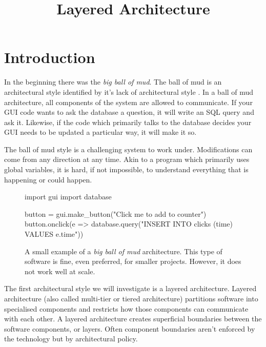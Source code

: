 \title{Layered Architecture}
\maketitle

\section{Introduction}
In the beginning there was the \textsl{big ball of mud}.
The ball of mud is an architectural style identified by it's lack of architectural style \cite{ballofmud}.
In a ball of mud architecture, all components of the system are allowed to communicate.
If your GUI code wants to ask the database a question, it will write an SQL query and ask it.
Likewise, if the code which primarily talks to the database decides your GUI needs to be updated a particular way, it will make it so.

The ball of mud style is a challenging system to work under.
Modifications can come from any direction at any time.
Akin to a program which primarily uses global variables,
it is hard, if not impossible,
to understand everything that is happening or could happen.



\begin{figure}[ht]
\begin{code}[style=python]{}
import gui
import database

button = gui.make_button("Click me to add to counter")
button.onclick(e => 
    database.query("INSERT INTO clicks (time) VALUES {{e.time}}"))
\end{code}
\caption{
A small example of a \textsl{big ball of mud} architecture.
This type of software is fine, even preferred, for smaller projects.
However, it does not work well at scale.
}
\end{figure}

The first architectural style we will investigate is a layered architecture.
Layered architecture (also called multi-tier or tiered architecture) 
partitions software into specialised components and restricts how those components can communicate with each other.
A layered architecture creates superficial boundaries between the software components, or layers.
Often component boundaries aren't enforced by the technology but by architectural policy.

